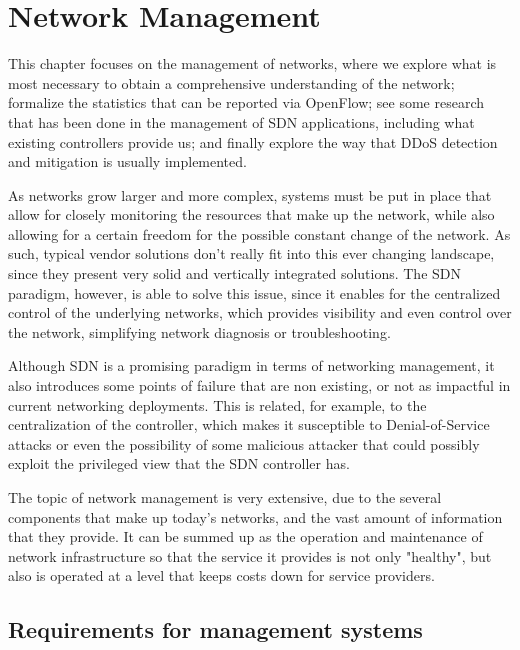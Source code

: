 \section{Network Management} \label{chap:nm} %

\par This chapter focuses on the management of networks, where we explore what is most necessary to obtain a comprehensive understanding of the network; formalize the statistics that can be reported via OpenFlow; see some 
research that has been done in the management of SDN applications, including what existing controllers provide us; and finally explore the way that DDoS detection and mitigation is usually implemented.

\par As networks grow larger and more complex, systems must be put in place that allow for closely monitoring the resources that make up the network, while also allowing for a certain freedom for the possible constant change of the 
network. As such, typical vendor solutions don't really fit into this ever changing landscape, since they present very solid and vertically integrated solutions. The SDN paradigm, however, is able to solve this issue, since it 
enables for the centralized control of the underlying networks, which provides visibility and even control over the network, simplifying network diagnosis or troubleshooting. 
\par Although SDN is a promising paradigm in terms of networking management, it also introduces some points of failure that are non existing, or not as impactful in current networking deployments. This is related, for example,
to the centralization of the controller, which makes it susceptible to Denial-of-Service attacks or even the possibility of some malicious attacker that could possibly exploit the privileged view that the SDN controller has.
\par The topic of network management is very extensive, due to the several components that make up today's networks, and the vast amount of information that they provide. It can be summed up as the operation and maintenance 
of network infrastructure so that the service it provides is not only "healthy", but also is operated at a level that keeps costs down for service providers. 

\subsection {Requirements for management systems}

